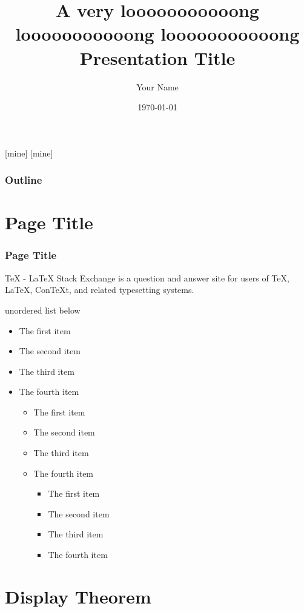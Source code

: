 \documentclass[10pt]{beamer}
\author{Your Name}
\title{A very looooooooooong  looooooooooong  looooooooooong Presentation Title}
\date{\today}
\begin{document}
[mine]
[mine]

\frame[plain]{\titlepage}

\begin{frame}
\frametitle{Outline}
\tableofcontents
\end{frame}

\section{Page Title}

\begin{frame}
\sectionpage
\end{frame}

\begin{frame}
\frametitle{Page Title}

TeX - LaTeX Stack Exchange is a question and answer site for users of TeX, LaTeX, ConTeXt, and related typesetting systems.

\vspace{0.4cm}

unordered list below

\begin{itemize}
\item The first item
\item The second item
\item The third item
\item The fourth item
\begin{itemize}
\item The first item
\item The second item
\item The third item
\item The fourth item
\begin{itemize}
\item The first item
\item The second item
\item The third item
\item The fourth item
\end{itemize}
\end{itemize}
\end{itemize}

\end{frame}

\section{Display Theorem}
\end{document}
